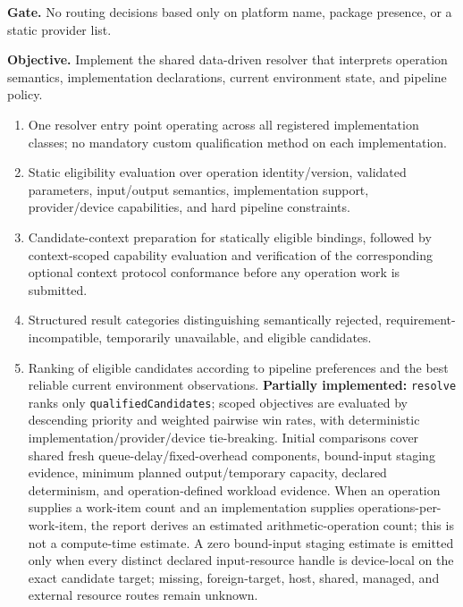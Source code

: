 \textbf{Gate.} No routing decisions based only on platform name, package presence, or a static provider list.


\textbf{Objective.} Implement the shared data-driven resolver that interprets operation semantics, implementation declarations, current environment state, and pipeline policy.

\deliverables
\begin{enumerate}
  \item One resolver entry point operating across all registered implementation classes; no mandatory custom qualification method on each implementation.
  \item Static eligibility evaluation over operation identity/version, validated parameters, input/output semantics, implementation support, provider/device capabilities, and hard pipeline constraints.
  \item Candidate-context preparation for statically eligible bindings, followed by context-scoped capability evaluation and verification of the corresponding optional context protocol conformance before any operation work is submitted.
  \item Structured result categories distinguishing semantically rejected, requirement-incompatible, temporarily unavailable, and eligible candidates.
  \item Ranking of eligible candidates according to pipeline preferences and the best reliable current environment observations. \textbf{Partially implemented:} \texttt{resolve} ranks only \texttt{qualifiedCandidates}; scoped objectives are evaluated by descending priority and weighted pairwise win rates, with deterministic implementation/provider/device tie-breaking. Initial comparisons cover shared fresh queue-delay/fixed-overhead components, bound-input staging evidence, minimum planned output/temporary capacity, declared determinism, and operation-defined workload evidence. When an operation supplies a work-item count and an implementation supplies operations-per-work-item, the report derives an estimated arithmetic-operation count; this is not a compute-time estimate. A zero bound-input staging estimate is emitted only when every distinct declared input-resource handle is device-local on the exact candidate target; missing, foreign-target, host, shared, managed, and external resource routes remain unknown.

\end{enumerate}
